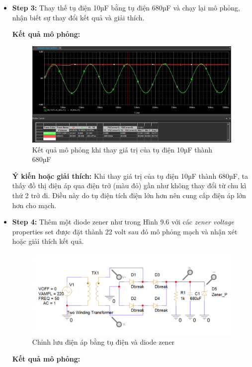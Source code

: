 \begin{itemize}
    \item \textbf{Step 3:} Thay thế tụ điện 10µF bằng tụ điện 680µF và chạy lại mô phỏng,
    nhận biết sự thay đổi kết quả và giải thích.
 \pagebreak

    \textbf{Kết quả mô phỏng: } 

    \begin{figure}[ht]
        \centering
        \includegraphics[scale= 0.2]{graphics/ex9/f5.png}
        \caption{Kết quả mô phỏng khi thay giá trị của tụ điện 10µF thành 680µF}
    \end{figure}

    \textbf{Ý kiến hoặc giải thích:} Khi thay giá trị của tụ điện 10µF thành 680µF, ta thấy đồ thị điện áp qua điện trở (màu đỏ) gần như không thay đổi từ chu kì thứ 2 trở đi. Điều này do tụ điện tích điện lớn hơn nên cung cấp điện áp lớn hơn cho mạch.

\item \textbf{Step 4:} Thêm một diode zener như trong Hình 9.6 với các \textit{zener voltage} properties set được đặt thành
22 volt sau đó mô phỏng mạch và nhận xét hoặc giải thích kết quả.

\begin{figure}[ht]
    \centering
    \includegraphics[scale= 0.23]{graphics/ex9/f6.png}
    \caption{Chỉnh lưu điện áp bằng tụ điện và diode zener}
\end{figure}
\pagebreak
\textbf{Kết quả mô phỏng: } 


\end{itemize}
